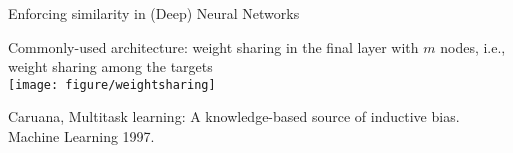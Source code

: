 \documentclass[11pt,compress,t,notes=noshow, xcolor=table]{beamer}
\begin{document}
\begin{frame}{Enforcing similarity in (Deep) Neural Networks}
	\begin{center}
		Commonly-used architecture: weight sharing in the final layer with $m$ nodes, i.e., weight sharing among the targets \\
		\texttt{[image: figure/weightsharing]}
	\end{center}

    {\tiny Caruana, Multitask learning: A knowledge-based source of inductive bias. Machine	Learning 1997.}
\end{frame}

\endlecture
\end{document}
